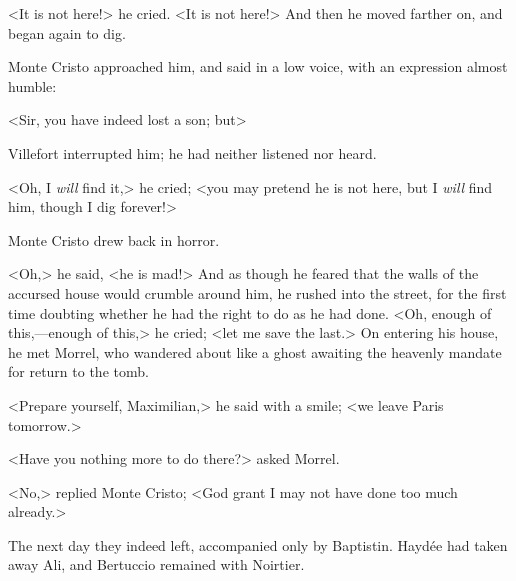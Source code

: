  <It is not here!> he cried. <It is not here!>  And then he moved farther on, and began again to dig. 

 Monte Cristo approached him, and said in a low voice, with an expression almost humble: 

 <Sir, you have indeed lost a son; but\longdash> 

 Villefort interrupted him; he had neither listened nor heard. 

 <Oh, I \textit{will} find it,> he cried; <you may pretend he is not here, but I \textit{will} find him, though I dig forever!> 

 Monte Cristo drew back in horror. 

 <Oh,> he said, <he is mad!> And as though he feared that the walls of the accursed house would crumble around him, he rushed into the street, for the first time doubting whether he had the right to do as he had done. <Oh, enough of this,—enough of this,> he cried; <let me save the last.> On entering his house, he met Morrel, who wandered about like a ghost awaiting the heavenly mandate for return to the tomb. 

 <Prepare yourself, Maximilian,> he said with a smile; <we leave Paris tomorrow.> 

 <Have you nothing more to do there?> asked Morrel. 

 <No,> replied Monte Cristo; <God grant I may not have done too much already.> 

 The next day they indeed left, accompanied only by Baptistin. Haydée had taken away Ali, and Bertuccio remained with Noirtier. 